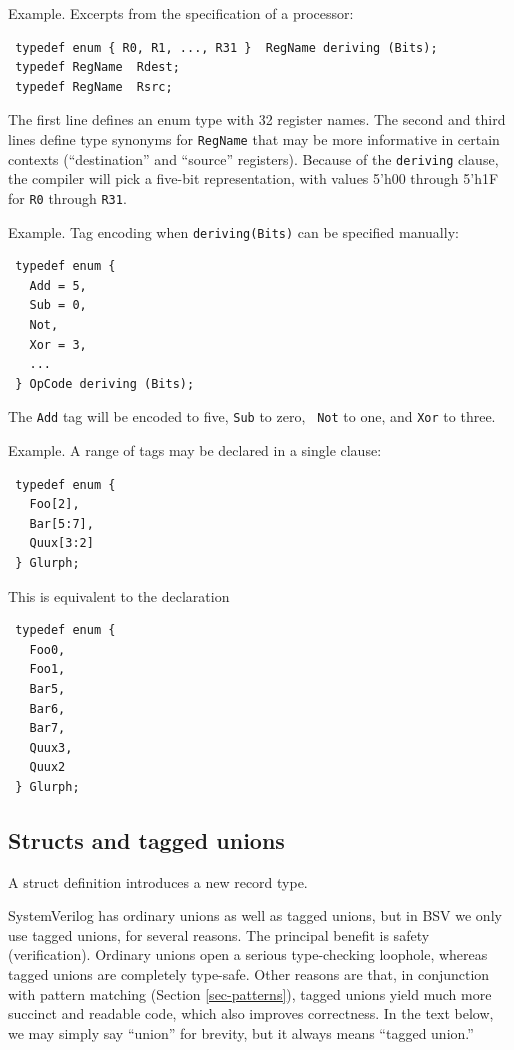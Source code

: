 \documentclass[twoside,letterpaper]{article}
\newcommand{\BSV}{BSV}
\newcommand{\SV}{SystemVerilog}
\begin{document}
Example. Excerpts from the specification of a processor:
\begin{verbatim}
 typedef enum { R0, R1, ..., R31 }  RegName deriving (Bits);
 typedef RegName  Rdest;
 typedef RegName  Rsrc;
\end{verbatim}
The first line defines an enum type with 32 register names.  The
second and third lines define type synonyms for \texttt{RegName} that may
be more informative in certain contexts (``destination'' and
``source'' registers).  Because of the \texttt{deriving} clause, the
compiler will pick a five-bit representation, with values 5'h00
through 5'h1F for \texttt{R0} through \texttt{R31}.

Example.  Tag encoding when \texttt{deriving(Bits)} can be specified manually:
\begin{verbatim}
 typedef enum {
   Add = 5,
   Sub = 0,
   Not,
   Xor = 3,
   ...
 } OpCode deriving (Bits);
\end{verbatim}
The \texttt{Add} tag will be encoded to five, \texttt{Sub} to zero, {\tt
Not} to one, and \texttt{Xor} to three.

Example.  A range of tags may be declared in a single clause:
\begin{verbatim}
 typedef enum {
   Foo[2],
   Bar[5:7],
   Quux[3:2]
 } Glurph;
\end{verbatim}
This is equivalent to the declaration
\begin{verbatim}
 typedef enum {
   Foo0,
   Foo1,
   Bar5,
   Bar6,
   Bar7,
   Quux3,
   Quux2
 } Glurph;
\end{verbatim}


\subsection{Structs and tagged unions}


\label{sec-struct-union-type}

A struct definition introduces a new record type.

{\SV} has ordinary unions as well as tagged unions, but in {\BSV} we
only use tagged unions, for several reasons.  The principal benefit is
safety (verification).  Ordinary unions open a serious type-checking
loophole, whereas tagged unions are completely type-safe.  Other
reasons are that, in conjunction with pattern matching (Section
\ref{sec-patterns}), tagged unions yield much more succinct and
readable code, which also improves correctness.  In the text below, we
may simply say ``union'' for brevity, but it always means ``tagged
union.''
\end{document}
